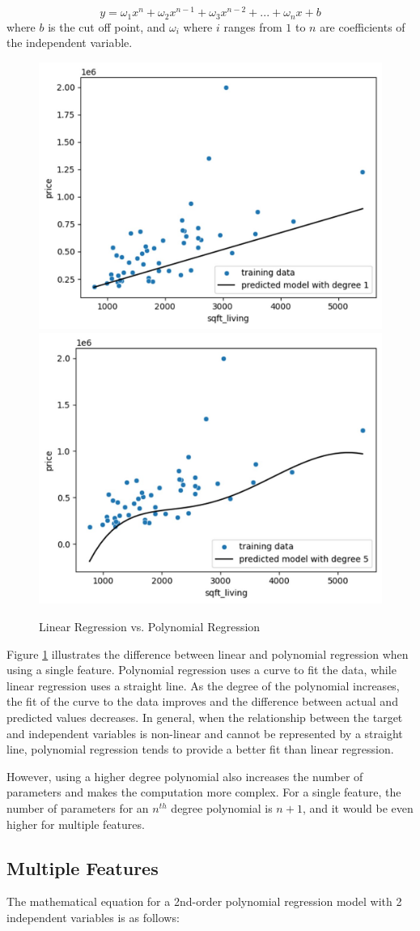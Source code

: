 {\begin{equation}\label{eq:polyEq}
  y = \omega_1 x^n + \omega_2 x^{n-1} + \omega_3 x^{n-2} + ... + \omega_n x + b
\end{equation} where $b$ is the cut off point, and $\omega_i$ where $i$ ranges from $1$ to $n$ are coefficients of the independent variable.


\begin{figure}[!ht]
  \centering
  \includegraphics[width=4 cm]{poly_demo1.jpg}
  \includegraphics[width=4 cm]{poly_demo2.jpg}
  \caption{Linear Regression vs. Polynomial Regression}
  \label{fig:polydemo}
\end{figure}

Figure \ref{fig:polydemo} illustrates the difference between linear and polynomial regression when using a single feature. Polynomial regression uses a curve to fit the data, while linear regression uses a straight line. As the degree of the polynomial increases, the fit of the curve to the data improves and the difference between actual and predicted values decreases. In general, when the relationship between the target and independent variables is non-linear and cannot be represented by a straight line, polynomial regression tends to provide a better fit than linear regression.

However, using a higher degree polynomial also increases the number of parameters and makes the computation more complex. For a single feature, the number of parameters for an $n^{th}$ degree polynomial is $n+1$, and it would be even higher for multiple features.
\newpage
\subsection{Multiple Features}
The mathematical equation for a 2nd-order polynomial regression model with 2 independent variables is as follows:

}
